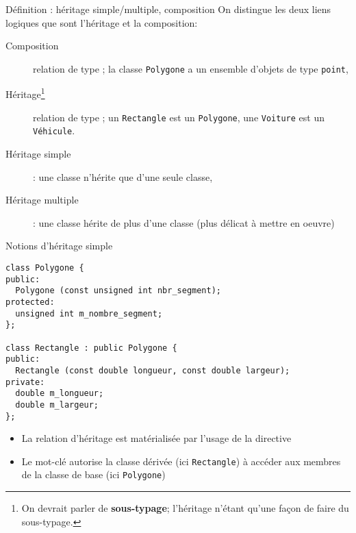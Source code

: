 \documentclass[c]{beamer}
\begin{document}
\begin{frame}[fragile]{Définition : héritage simple/multiple, composition}
On distingue les deux liens logiques que sont l'héritage et la composition:

\begin{description}
\item[{Composition}] relation de type ; la classe \texttt{Polygone} a
un ensemble d'objets de type \texttt{point}, 
\item[{Héritage\footnote{On devrait parler de \textbf{sous-typage}; l'héritage n'étant qu'une façon de faire du sous-typage.}}] relation de type ; un \texttt{Rectangle} est un
\texttt{Polygone}, une \texttt{Voiture} est un \texttt{Véhicule}.
\end{description}

\bigskip

\begin{description}
\item[{Héritage simple}] : une classe n'hérite que d'une seule classe, 
\item[{Héritage multiple}] : une classe hérite de plus d'une classe (plus délicat à mettre en oeuvre) 
\end{description}

\end{frame}


\begin{frame}[fragile]{Notions d'héritage simple}
 \begin{verbatim}
class Polygone {
public:
  Polygone (const unsigned int nbr_segment); 
protected:
  unsigned int m_nombre_segment;
};

class Rectangle : public Polygone {
public:
  Rectangle (const double longueur, const double largeur);
private:
  double m_longueur;
  double m_largeur;
};
\end{verbatim}

\pause
\begin{itemize}
\item La relation d'héritage est matérialisée par l'usage de la directive 
\end{itemize}
\pause
\begin{itemize}
\item Le mot-clé  autorise la classe dérivée (ici \texttt{Rectangle}) à accéder
aux membres de la classe de base (ici \texttt{Polygone})
\end{itemize}
\end{frame}
\end{document}
